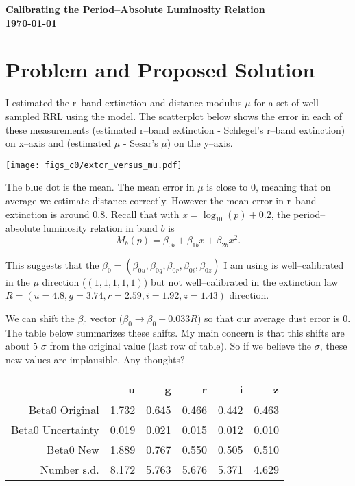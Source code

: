 \documentclass[12pt]{article}
\title{}
\date{}
\author{}
\begin{document}
\noindent
\textbf{Calibrating the Period--Absolute Luminosity Relation}\\
\textbf{\today}\\

\section{Problem and Proposed Solution}

I estimated the r--band extinction and distance modulus $\mu$ for a set of well--sampled RRL using the model. The scatterplot below shows the error in each of these measurements (estimated r--band extinction - Schlegel's r--band extinction) on x--axis and (estimated $\mu$ - Sesar's $\mu$) on the y--axis.

\begin{center}
\texttt{[image: figs\_c0/extcr\_versus\_mu.pdf]}
\end{center}

The blue dot is the mean. The mean error in $\mu$ is close to $0$, meaning that on average we estimate distance correctly. However the mean error in r--band extinction is around $0.8$. Recall that with $x = \log_{10}(p) + 0.2$, the period--absolute luminosity relation in band $b$ is
\begin{equation*}
  M_{b}(p) = \beta_{0b} + \beta_{1b}x  + \beta_{2b}x^2.
\end{equation*}


This suggests that the $\beta_0 = (\beta_{0u},\beta_{0g},\beta_{0r},\beta_{0i},\beta_{0z})$ I am using is well--calibrated in the $\mu$ direction ($(1,1,1,1,1)$) but not well--calibrated in the extinction law $R = (u=4.8,g=3.74,r=2.59,i=1.92,z=1.43)$ direction.

We can shift the $\beta_0$ vector ($\beta_0 \rightarrow \beta_0 + 0.033R$) so that our average dust error is 0. The table below summarizes these shifts. My main concern is that this shifts are about 5 $\sigma$ from the original value (last row of table). So if we believe the $\sigma$, these new values are implausible. Any thoughts?

\begin{center}
\begin{tabular}{rrrrrr}
  & u & g & r & i & z \\ 
  \hline
Beta0 Original & 1.732 & 0.645 & 0.466 & 0.442 & 0.463 \\ 
  Beta0 Uncertainty & 0.019 & 0.021 & 0.015 & 0.012 & 0.010 \\ 
  Beta0 New & 1.889 & 0.767 & 0.550 & 0.505 & 0.510 \\ 
  Number s.d. & 8.172 & 5.763 & 5.676 & 5.371 & 4.629 \\ 
  \end{tabular}
\end{center}
\end{document}
